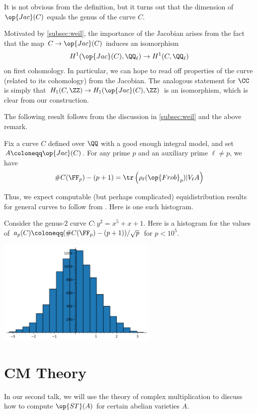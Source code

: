 \documentclass{article}
\begin{document}
\begin{remark}
	It is not obvious from the definition, but it turns out that the dimension of $\op{Jac}(C)$ equals the genus of the curve $C$.
\end{remark}
\begin{remark}
	Motivated by \cref{subsec:weil}, the importance of the Jacobian arises from the fact that the map $C\to\op{Jac}(C)$ induces an isomorphism
	\[H^1(\op{Jac}(C),\QQ_\ell)\to H^1(C,\QQ_\ell)\]
	on first cohomology. In particular, we can hope to read off properties of the curve (related to its cohomology) from the Jacobian. The analogous statement for $\CC$ is simply that $H_1(C,\ZZ)\to H_1(\op{Jac}(C),\ZZ)$ is an isomorphism, which is clear from our construction.
\end{remark}
The following result follows from the discussion in \cref{subsec:weil} and the above remark.
\begin{proposition}
	Fix a curve $C$ defined over $\QQ$ with a good enough integral model, and set $A\coloneqq\op{Jac}(C)$. For any prime $p$ and an auxiliary prime $\ell\ne p$, we have
	\[\#C(\FF_p)-(p+1)=\tr\left(\rho_\ell({\op{Frob}_p})\vert V_\ell A\right)\]
\end{proposition}
Thus, we expect computable (but perhaps complicated) equidistribution results for general curves to follow from . Here is one such histogram.
\begin{example}
	Consider the genus-$2$ curve $C\colon y^2=x^5+x+1$. Here is a histogram for the values of $a_p(C)\coloneqq(\#C(\FF_p)-(p+1))/\sqrt p$ for $p<10^5$.
	\begin{center}
		\includegraphics[height=2in]{hyper.png}
	\end{center}
\end{example}

\section{CM Theory}
In our second talk, we will use the theory of complex multiplication to discuss how to compute $\op{ST}(A)$ for certain abelian varieties $A$.
\end{document}
